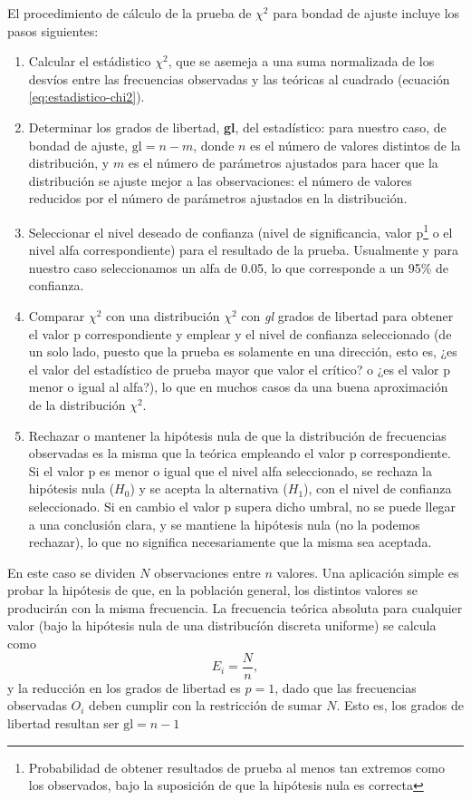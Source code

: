 El procedimiento de cálculo de la prueba de $\chi^{2}$ para bondad de ajuste incluye los pasos siguientes:
\begin{enumerate}
  \item Calcular el estádistico $\chi^{2}$, que se asemeja a una suma normalizada de los desvíos entre las frecuencias observadas y las teóricas al cuadrado (ecuación \ref{eq:estadistico-chi2}).
  \item Determinar los grados de libertad, \textbf{gl}, del estadístico: para nuestro caso, de bondad de ajuste, $\text{gl} = n - m$, donde $n$ es el número de valores distintos de la distribución, y $m$ es el número de parámetros ajustados para hacer que la distribución se ajuste mejor a las observaciones: el número de valores reducidos por el número de parámetros ajustados en la distribución.
  \item Seleccionar el nivel deseado de confianza (nivel de significancia, valor p\footnote{Probabilidad de obtener resultados de prueba al menos tan extremos como los observados, bajo la suposición de que la hipótesis nula es correcta\cite{enwiki2022pvalue}} o el nivel alfa correspondiente) para el resultado de la prueba. Usualmente y para nuestro caso seleccionamos un alfa de 0.05, lo que corresponde a un 95\% de confianza.
  \item Comparar $\chi^{2}$ con una distribución $\chi^{2}$ con \emph{gl} grados de libertad para obtener el valor p correspondiente y emplear y el nivel de confianza seleccionado (de un solo lado, puesto que la prueba es solamente en una dirección, esto es, ¿es el valor del estadístico de prueba mayor que valor el crítico? o ¿es el valor p menor o igual al alfa?), lo que en muchos casos da una buena aproximación de la distribución $\chi^{2}$.
  \item Rechazar o mantener la hipótesis nula de que la distribución de frecuencias observadas es la misma que la teórica empleando el valor p correspondiente. Si el valor p es menor o igual que el nivel alfa seleccionado, se rechaza la hipótesis nula ($H_{0}$) y se acepta la alternativa ($H_{1}$), con el nivel de confianza seleccionado. Si en cambio el valor p supera dicho umbral, no se puede llegar a una conclusión clara, y se mantiene la hipótesis nula (no la podemos rechazar), lo que no significa necesariamente que la misma sea aceptada.
\end{enumerate}

En este caso se dividen $N$ observaciones entre $n$ valores. Una aplicación simple es probar la hipótesis de que, en la población general, los distintos valores se producirán con la misma frecuencia. La frecuencia teórica absoluta para cualquier valor (bajo la hipótesis nula de una distribucíón discreta uniforme) se calcula como
\begin{equation*}
  E_i=\frac{N}{n},
\end{equation*}
y la reducción en los grados de libertad es $p=1$, dado que las frecuencias observadas $O_{i}$ deben cumplir con la restricción de sumar $N$. Esto es, los grados de libertad resultan ser $\text{gl} = n - 1$


